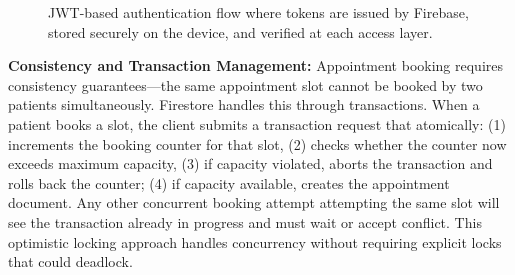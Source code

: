 \documentclass[12pt,a4paper]{report}
\begin{document}
\begin{figure}[H]
\centering
{}
\caption{JWT-based authentication flow where tokens are issued by Firebase, stored securely on the device, and verified at each access layer.}
\end{figure}

\textbf{Consistency and Transaction Management:} Appointment booking requires consistency guarantees—the same appointment slot cannot be booked by two patients simultaneously. Firestore handles this through transactions. When a patient books a slot, the client submits a transaction request that atomically: (1) increments the booking counter for that slot, (2) checks whether the counter now exceeds maximum capacity, (3) if capacity violated, aborts the transaction and rolls back the counter; (4) if capacity available, creates the appointment document. Any other concurrent booking attempt attempting the same slot will see the transaction already in progress and must wait or accept conflict. This optimistic locking approach handles concurrency without requiring explicit locks that could deadlock.
\end{document}

